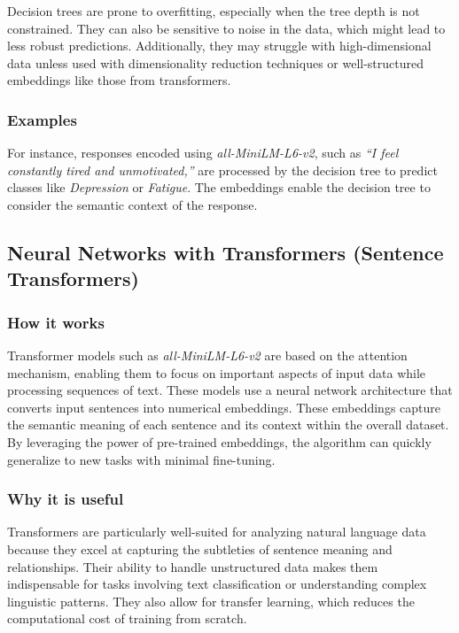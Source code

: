 \documentclass[runningheads,a4paper,11pt]{report}
\begin{document}
Decision trees are prone to overfitting, especially when the tree depth is not constrained. They can also be sensitive to noise in the data, which might lead to less robust predictions. Additionally, they may struggle with high-dimensional data unless used with dimensionality reduction techniques or well-structured embeddings like those from transformers.

\subsubsection{Examples}
\label{subsubsection:decision_tree_examples}

For instance, responses encoded using \textit{all-MiniLM-L6-v2}, such as \textit{``I feel constantly tired and unmotivated,''} are processed by the decision tree to predict classes like \textit{Depression} or \textit{Fatigue}. The embeddings enable the decision tree to consider the semantic context of the response.

\subsection{Neural Networks with Transformers (Sentence Transformers)}
\label{subsection:transformers}

\subsubsection{How it works}
\label{subsubsection:transformers_how_it_works}

Transformer models such as \textit{all-MiniLM-L6-v2} are based on the attention mechanism, enabling them to focus on important aspects of input data while processing sequences of text. These models use a neural network architecture that converts input sentences into numerical embeddings. These embeddings capture the semantic meaning of each sentence and its context within the overall dataset. By leveraging the power of pre-trained embeddings, the algorithm can quickly generalize to new tasks with minimal fine-tuning.

\subsubsection{Why it is useful}
\label{subsubsection:transformers_why_useful}

Transformers are particularly well-suited for analyzing natural language data because they excel at capturing the subtleties of sentence meaning and relationships. Their ability to handle unstructured data makes them indispensable for tasks involving text classification or understanding complex linguistic patterns. They also allow for transfer learning, which reduces the computational cost of training from scratch.
\end{document}
